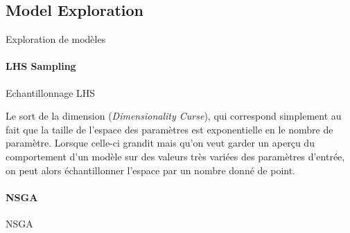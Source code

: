 \subsection*{Model Exploration}{Exploration de modèles}





\paragraph{LHS Sampling}{Echantillonnage LHS}

Le sort de la dimension (\emph{Dimensionality Curse}), qui correspond simplement au fait que la taille de l'espace des paramètres est exponentielle en le nombre de paramètre. Lorsque celle-ci grandit mais qu'on veut garder un aperçu du comportement d'un modèle sur des valeurs très variées des paramètres d'entrée, on peut alors échantillonner l'espace par un nombre donné de point.



 

\paragraph{NSGA}{NSGA}















